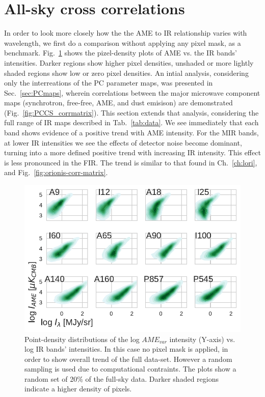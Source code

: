   \section{All-sky cross correlations}
        In order to look more closely how the the AME to IR relationship varies with wavelength, we first do a comparison without applying any pixel mask, as a benchmark. Fig.~\ref{fig:AMEvsDust_allsky_allbands_mpsub_kde_unmasked} shows the pizel-density plots of AME vs. the IR bands' intensities. Darker regions show higher pixel densities, unshaded or more lightly shaded regions show low or zero pixel densities. An intial analysis, considering only the interreations of the PC parameter maps, was presented in Sec.~\ref{sec:PCmaps}, wherein correlations between the major microwave component maps (synchrotron, free-free, AME, and dust emisison) are demonstrated (Fig.~\ref{fig:PCCS_corrmatrix}). This section extends that analysis, considering the full range of IR maps described in Tab.~\ref{tab:data}. We see immediately that each band shows evidence of a positive trend with AME intensity. For the MIR bands, at lower IR intensities we see the effects of detector noise become dominant, turning into a more defined positive trend with increasing IR intensity. This effect is less pronounced in the FIR. The trend is similar to that found in Ch.~\ref{ch:lori}, and Fig.~\ref{fig:orionis-corr-matrix}.
          \begin{figure}
            \includegraphics[width=\textwidth]{../Plots/ch_allsky/AMEvsDust_allsky_allbands_mpsub_kde_unmasked.pdf}
            \centering
            \caption{Point-density distributions of the log $AME_{var}$ intensity (Y-axis) vs. log IR bands' intensities. In this case no pixel mask is applied, in order to show overall trend of the full data-set. However a random sampling is used due to computational contraints. The plots show a random set of 20\% of the full-sky data. Darker shaded regions indicate a higher density of pixels.}
            \label{fig:AMEvsDust_allsky_allbands_mpsub_kde_unmasked}
          \end{figure}
